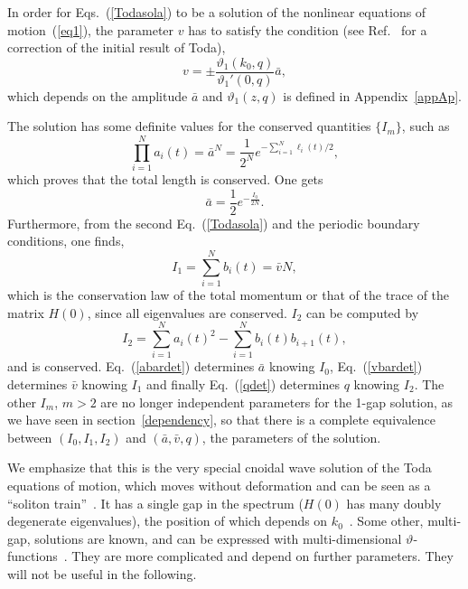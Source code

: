 \documentclass[]{revtex4-1}
\begin{document}
In order for Eqs.~(\ref{Todasola}) to be a solution of the nonlinear equations of motion~(\ref{eq1}), the parameter $v$ has to satisfy the condition (see Ref.~\cite{Shastry} for a correction of the initial result of Toda), \begin{equation} v= \pm \frac{ \vartheta_{1}(k_0,q)}{\vartheta_{1}'(0,q)} \bar{a}, \label{vd1} \end{equation} which depends on the amplitude $\bar{a}$ and   $ \vartheta_{1}(z,q)$ is defined in Appendix~\ref{appAp}.  

The solution has some definite values for the conserved quantities $\{I_m\}$, such as  
\begin{equation}
  \prod_{i=1}^{N} a_i(t)=\bar{a}^N=\frac{1}{2^N} e^{-\sum_{i=1}^{N} \ell_i(t)/2},
\end{equation}
which proves that the total length is conserved. One gets \begin{equation} \bar{a}=\frac{1}{2} e^{-\frac{I_0}{2N}}.\label{abardet} \end{equation} Furthermore, from the second Eq.~(\ref{Todasola}) and the periodic boundary conditions, one finds,
\begin{equation}
I_1=  \sum_{i=1}^{N} b_i(t)=\bar{v} N, \label{vbardet}
\end{equation}
which is the conservation law of the total momentum or that of the trace of the matrix $H(0)$, since all eigenvalues are conserved. $I_2$ can be computed by
\begin{equation}
I_2 = \sum_{i=1}^{N} a_i(t)^2- \sum_{i=1}^{N} b_i(t)b_{i+1}(t), \label{qdet}
\end{equation}
and is conserved. Eq.~(\ref{abardet}) determines $\bar{a}$ knowing $I_0$, Eq.~(\ref{vbardet}) determines $\bar{v}$ knowing $I_1$ and finally Eq.~(\ref{qdet}) determines $q$ knowing $I_2$. The other $I_m$, $m>2$ are no longer independent parameters for the 1-gap solution, as we have seen in section~\ref{dependency}, so that there is a complete equivalence between $(I_0,I_1,I_2)$ and $(\bar{a},\bar{v},q)$, the parameters of the solution.

We emphasize that this is the very special cnoidal wave solution of the Toda equations of motion, which moves without deformation and can be seen as a ``soliton train''~\cite{Toda,Todabook}. It has a single gap in the spectrum ($H(0)$ has many doubly degenerate eigenvalues), the position of which depends on $k_0$~\cite{notegap}. Some other, multi-gap, solutions are known, and can be expressed with multi-dimensional $\vartheta$-functions~\cite{ItsMatveev}. They are more complicated and depend on further parameters. They will not be useful in the following. 
\end{document}
